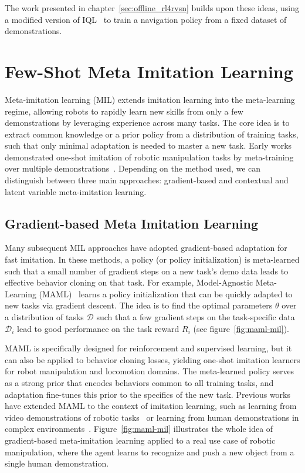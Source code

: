 The work presented in chapter~\ref{sec:offline_rl4rvsn} builds upon these ideas, using a modified version of IQL~\cite{kostrikov2022offline} to train a navigation policy from a fixed dataset of demonstrations.

\section{Few-Shot Meta Imitation Learning}\label{sec:meta-imitation-learning}

Meta-imitation learning (MIL) extends imitation learning into the meta-learning regime, allowing robots to rapidly learn new skills from only a few demonstrations by leveraging experience across many tasks.
The core idea is to extract common knowledge or a prior policy from a distribution of training tasks, such that only minimal adaptation is needed to master a new task.
Early works demonstrated one-shot imitation of robotic manipulation tasks by meta-training over multiple demonstrations~\cite{Duan2017OneShotIL, finnOneShotVisualImitation2017}.
Depending on the method used, we can distinguish between three main approaches: gradient-based and contextual and latent variable meta-imitation learning.

\subsection{Gradient-based Meta Imitation Learning}\label{subsec:gradient-based-meta-imitation-learning}

Many subsequent MIL approaches have adopted gradient-based adaptation for fast imitation.
In these methods, a policy (or policy initialization) is meta-learned such that a small number of gradient steps on a new task’s demo data leads to effective behavior cloning on that task.
For example, Model-Agnostic Meta-Learning (MAML)~\cite{finn2017} learns a policy initialization that can be quickly adapted to new tasks via gradient descent.
The idea is to find the optimal parameters $\theta$ over a distribution of tasks $\mathcal{D}$ such that a few gradient steps on the task-specific data $\mathcal{D}_i$ lead to good performance on the task reward $R_i$ (see figure~\ref{fig:maml-mil}).

MAML is specifically designed for reinforcement and supervised learning, but it can also be applied to behavior cloning losses, yielding one-shot imitation learners for robot manipulation and locomotion domains.
The meta-learned policy serves as a strong prior that encodes behaviors common to all training tasks, and adaptation fine-tunes this prior to the specifics of the new task.
Previous works have extended MAML to the context of imitation learning, such as learning from video demonstrations of robotic tasks~\cite{finnOneShotVisualImitation2017} or learning from human demonstrations in complex environments~\cite{Yu2018OneShotIF}.
Figure~\ref{fig:maml-mil} illustrates the whole idea of gradient-based meta-imitation learning applied to a real use case of robotic manipulation, where the agent learns to recognize and push a new object from a single human demonstration.

